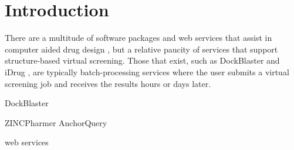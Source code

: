\section{Introduction}

There are a multitude of software packages and web services that assist in computer aided drug design \cite{Villoutreix_2013}, but a relative paucity of services that support structure-based virtual screening.  Those that exist, such as DockBlaster \cite{Irwin_2009} and iDrug \cite{Wang_2014}, are typically batch-processing services where the user submits a virtual screening job and receives the results hours or days later.



DockBlaster \cite{Irwin_2009}

ZINCPharmer  \cite{Koes_2012}
AnchorQuery \cite{Koes_2012}

web services 